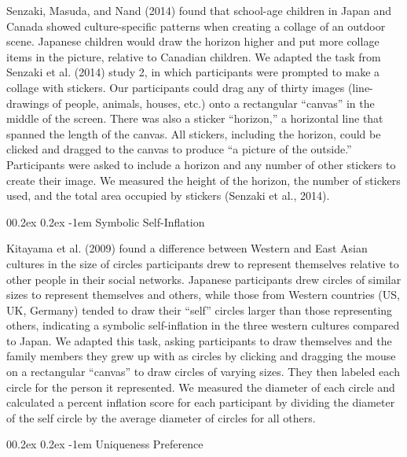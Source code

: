 \documentclass[
  man]{apa6}
\makeatletter
\let\oldparagraph\paragraph
\renewcommand{\paragraph}[1]{\oldparagraph{#1}\mbox{}}
\renewcommand{\paragraph}{\@startsection{paragraph}{4}{\parindent}%
  {0\baselineskip \@plus 0.2ex \@minus 0.2ex}%
  {-1em}%
  {\normalfont\normalsize\bfseries\itshape\typesectitle}}
\makeatother
\begin{document}
Senzaki, Masuda, and Nand (2014) found that school-age children in Japan and Canada showed culture-specific patterns when creating a collage of an outdoor scene. Japanese children would draw the horizon higher and put more collage items in the picture, relative to Canadian children. We adapted the task from Senzaki et al. (2014) study 2, in which participants were prompted to make a collage with stickers. Our participants could drag any of thirty images (line-drawings of people, animals, houses, etc.) onto a rectangular ``canvas'' in the middle of the screen. There was also a sticker ``horizon,'' a horizontal line that spanned the length of the canvas. All stickers, including the horizon, could be clicked and dragged to the canvas to produce ``a picture of the outside.'' Participants were asked to include a horizon and any number of other stickers to create their image. We measured the height of the horizon, the number of stickers used, and the total area occupied by stickers (Senzaki et al., 2014).

\hypertarget{symbolic-self-inflation}{%
\paragraph{Symbolic Self-Inflation}\label{symbolic-self-inflation}}

Kitayama et al. (2009) found a difference between Western and East Asian cultures in the size of circles participants drew to represent themselves relative to other people in their social networks. Japanese participants drew circles of similar sizes to represent themselves and others, while those from Western countries (US, UK, Germany) tended to draw their ``self'' circles larger than those representing others, indicating a symbolic self-inflation in the three western cultures compared to Japan. We adapted this task, asking participants to draw themselves and the family members they grew up with as circles by clicking and dragging the mouse on a rectangular ``canvas'' to draw circles of varying sizes. They then labeled each circle for the person it represented. We measured the diameter of each circle and calculated a percent inflation score for each participant by dividing the diameter of the self circle by the average diameter of circles for all others.

\hypertarget{uniqueness-preference}{%
\paragraph{Uniqueness Preference}\label{uniqueness-preference}}
\end{document}
